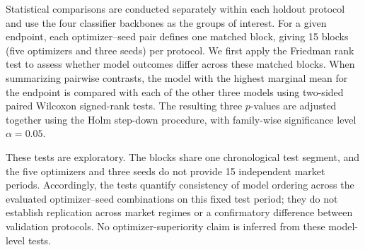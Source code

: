 Statistical comparisons are conducted separately within each holdout protocol and use the four classifier backbones as the groups of interest. For a given endpoint, each optimizer--seed pair defines one matched block, giving 15 blocks (five optimizers and three seeds) per protocol. We first apply the Friedman rank test to assess whether model outcomes differ across these matched blocks. When summarizing pairwise contrasts, the model with the highest marginal mean for the endpoint is compared with each of the other three models using two-sided paired Wilcoxon signed-rank tests. The resulting three $p$-values are adjusted together using the Holm step-down procedure, with family-wise significance level $\alpha=0.05$.

These tests are exploratory. The blocks share one chronological test segment, and the five optimizers and three seeds do not provide 15 independent market periods. Accordingly, the tests quantify consistency of model ordering across the evaluated optimizer--seed combinations on this fixed test period; they do not establish replication across market regimes or a confirmatory difference between validation protocols. No optimizer-superiority claim is inferred from these model-level tests.
